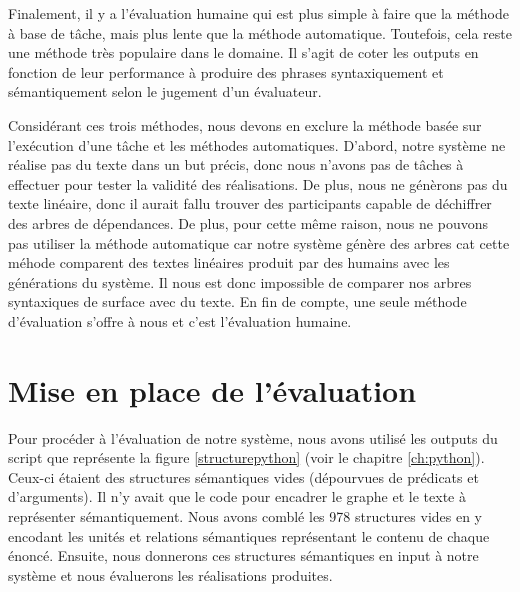 Finalement, il y a l'évaluation humaine qui est plus simple à faire que la méthode à base de tâche, mais plus lente que la méthode automatique. Toutefois, cela reste une méthode très populaire dans le domaine. Il s'agit de coter les outputs en fonction de leur performance à produire des phrases syntaxiquement et sémantiquement selon le jugement d'un évaluateur.

Considérant ces trois méthodes, nous devons en exclure la méthode basée sur l'exécution d'une tâche et les méthodes automatiques. D'abord, notre système ne réalise pas du texte dans un but précis, donc nous n'avons pas de tâches à effectuer pour tester la validité des réalisations. De plus, nous ne génèrons pas du texte linéaire, donc il aurait fallu trouver des participants capable de déchiffrer des arbres de dépendances. De plus, pour cette même raison, nous ne pouvons pas utiliser la méthode automatique car notre système génère des arbres cat cette méhode comparent des textes linéaires produit par des humains avec les générations du système. Il nous est donc impossible de comparer nos arbres syntaxiques de surface avec du texte. En fin de compte, une seule méthode d'évaluation s'offre à nous et c'est l'évaluation humaine.

\section{Mise en place de l'évaluation}
Pour procéder à l'évaluation de notre système, nous avons utilisé les outputs du script que représente la figure \ref{structurepython} (voir le chapitre \ref{ch:python}). Ceux-ci étaient des structures sémantiques vides (dépourvues de prédicats et d'arguments). Il n'y avait que le code pour encadrer le graphe et le texte à représenter sémantiquement. Nous avons comblé les 978 structures vides en y encodant les unités et relations sémantiques représentant le contenu de chaque énoncé. Ensuite, nous donnerons ces structures sémantiques en input à notre système et nous évaluerons les réalisations produites.


